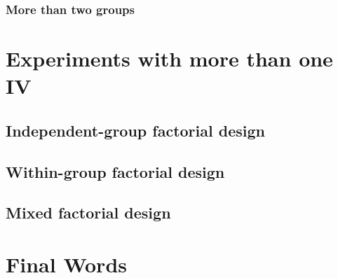 \documentclass[
]{book}
\begin{document}
\hypertarget{more-than-two-groups-1}{%
\subsection{More than two groups}\label{more-than-two-groups-1}}

\hypertarget{experiments-with-more-than-one-iv}{%
\chapter{Experiments with more than one IV}\label{experiments-with-more-than-one-iv}}

\hypertarget{independent-group-factorial-design}{%
\section{Independent-group factorial design}\label{independent-group-factorial-design}}

\hypertarget{within-group-factorial-design}{%
\section{Within-group factorial design}\label{within-group-factorial-design}}

\hypertarget{mixed-factorial-design}{%
\section{Mixed factorial design}\label{mixed-factorial-design}}

\hypertarget{final-words}{%
\chapter{Final Words}\label{final-words}}

  
\end{document}
